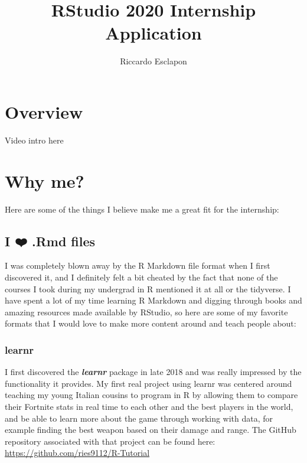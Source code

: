 \documentclass[
]{book}
\title{RStudio 2020 Internship Application}
\author{Riccardo Esclapon}
\date{}
\begin{document}
\maketitle

{
\setcounter{tocdepth}{1}
\tableofcontents
}
\hypertarget{overview}{%
\chapter{Overview}\label{overview}}

Video intro here

\hypertarget{fit}{%
\chapter{Why me?}\label{fit}}

Here are some of the things I believe make me a great fit for the internship:

\hypertarget{i-uxfe0f-.rmd-files}{%
\section{I ❤️ .Rmd files}\label{i-uxfe0f-.rmd-files}}

I was completely blown away by the R Markdown file format when I first discovered it, and I definitely felt a bit cheated by the fact that none of the courses I took during my undergrad in R mentioned it at all or the tidyverse. I have spent a lot of my time learning R Markdown and digging through books and amazing resources made available by RStudio, so here are some of my favorite formats that I would love to make more content around and teach people about:

\hypertarget{learnr}{%
\subsection{learnr}\label{learnr}}

I first discovered the \textbf{\emph{learnr}} \citep{R-learnr} package in late 2018 and was really impressed by the functionality it provides. My first real project using learnr was centered around teaching my young Italian cousins to program in R by allowing them to compare their Fortnite stats in real time to each other and the best players in the world, and be able to learn more about the game through working with data, for example finding the best weapon based on their damage and range. The GitHub repository associated with that project can be found here: \url{https://github.com/ries9112/R-Tutorial}
\end{document}
